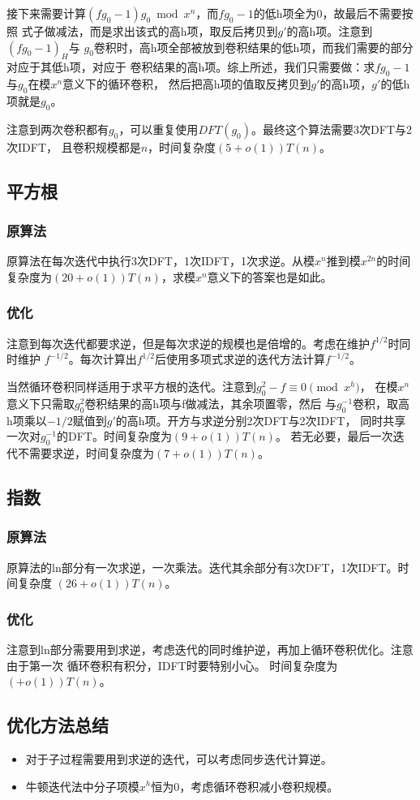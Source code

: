 接下来需要计算$(fg_0-1)g_0\bmod{x^n}$，而$fg_0-1$的低h项全为0，故最后不需要按照
式子做减法，而是求出该式的高h项，取反后拷贝到$g'$的高h项。注意到$(fg_0-1)_H$与
$g_0$卷积时，高h项全部被放到卷积结果的低h项，而我们需要的部分对应于其低h项，对应于
卷积结果的高h项。综上所述，我们只需要做：求$fg_0-1$与$g_0$在模$x^n$意义下的循环卷积，
然后把高h项的值取反拷贝到$g'$的高h项，$g'$的低h项就是$g_0$。

注意到两次卷积都有$g_0$，可以重复使用$DFT(g_0)$。最终这个算法需要3次DFT与2次IDFT，
且卷积规模都是$n$，时间复杂度$(5+o(1))T(n)$。
\subsection{平方根}
\subsubsection{原算法}
原算法在每次迭代中执行3次DFT，1次IDFT，1次求逆。从模$x^n$推到模$x^{2n}$的时间
复杂度为$(20+o(1))T(n)$，求模$x^n$意义下的答案也是如此。
\subsubsection{优化}
注意到每次迭代都要求逆，但是每次求逆的规模也是倍增的。考虑在维护$f^{1/2}$时同时维护
$f^{-1/2}$。每次计算出$f^{1/2}$后使用多项式求逆的迭代方法计算$f^{-1/2}$。

当然循环卷积同样适用于求平方根的迭代。注意到$g_0^2-f\equiv 0 \pmod{x^h}$，
在模$x^n$意义下只需取$g_0^2$卷积结果的高h项与f做减法，其余项置零，然后
与$g^{-1}_0$卷积，取高h项乘以$-1/2$赋值到$g'$的高h项。开方与求逆分别2次DFT与2次IDFT，
同时共享一次对$g_0^{-1}$的DFT。时间复杂度为$(9+o(1))T(n)$。
若无必要，最后一次迭代不需要求逆，时间复杂度为$(7+o(1))T(n)$。
\subsection{指数}
\subsubsection{原算法}
原算法的ln部分有一次求逆，一次乘法。迭代其余部分有3次DFT，1次IDFT。时间复杂度
$(26+o(1))T(n)$。
\subsubsection{优化}
注意到ln部分需要用到求逆，考虑迭代的同时维护逆，再加上循环卷积优化。注意由于第一次
循环卷积有积分，IDFT时要特别小心。
时间复杂度为$(+o(1))T(n)$。
\subsection{优化方法总结}
\begin{itemize}
    \item 对于子过程需要用到求逆的迭代，可以考虑同步迭代计算逆。
    \item 牛顿迭代法中分子项模$x^h$恒为0，考虑循环卷积减小卷积规模。
\end{itemize}
